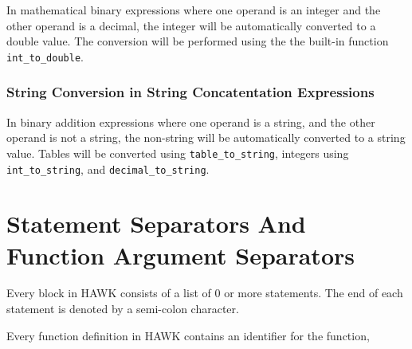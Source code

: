 \documentclass[12pt]{article}
\begin{document}
In mathematical binary expressions where one operand is an integer and the other operand is a decimal, the integer will be automatically converted to a double value. The conversion will be performed using the the built-in function \texttt{int\_to\_double}.

\subsubsection*{String Conversion in String Concatentation Expressions}

In binary addition expressions where one operand is a string, and the other operand is not a string, the non-string will be automatically converted to a string value. Tables will be converted using \texttt{table\_to\_string}, integers using \texttt{int\_to\_string}, and \texttt{decimal\_to\_string}.

\section*{Statement Separators And Function Argument Separators}

Every block in HAWK consists of a list of 0 or more statements. The end of each statement is denoted by a semi-colon character.

Every function definition in HAWK contains an identifier for the function, 
\end{document}
